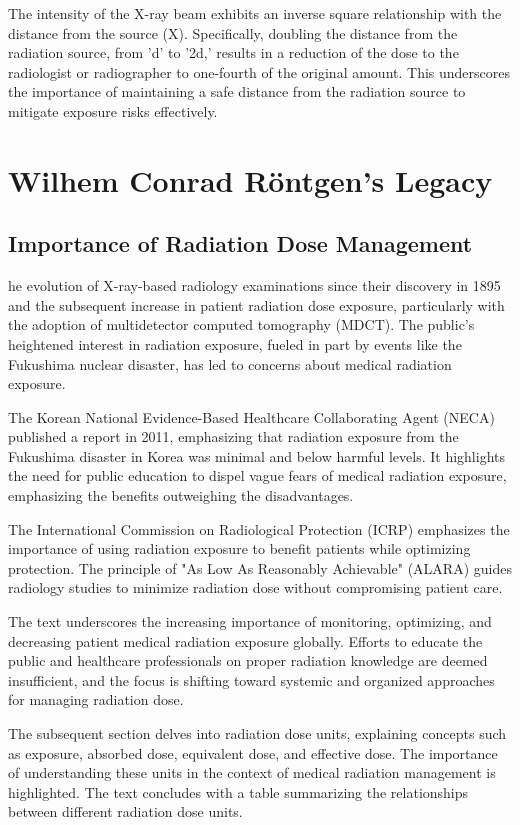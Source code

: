\documentclass[a4paper,12pt]{report}
\begin{document}
The intensity of the X-ray beam exhibits an inverse square relationship with the distance from the
source (X). Specifically, doubling the distance from the radiation source, from 'd' to '2d,' results
in a reduction of the dose to the radiologist or radiographer to one-fourth of the original amount.
This underscores the importance of maintaining a safe distance from the radiation source to
mitigate exposure risks effectively.

\chapter{Wilhem Conrad Röntgen's Legacy}
\section{Importance of Radiation Dose Management}

he evolution of X-ray-based radiology examinations since their discovery in 1895 and the
subsequent increase in patient radiation dose exposure, particularly with the adoption of
multidetector computed tomography (MDCT). The public's heightened interest in radiation
exposure, fueled in part by events like the Fukushima nuclear disaster, has led to concerns about
medical radiation exposure.

The Korean National Evidence-Based Healthcare Collaborating Agent (NECA) published a
report  in 2011, emphasizing that radiation exposure from the Fukushima disaster in Korea was
minimal and below harmful levels. It highlights the need for public education to dispel vague
fears of medical radiation exposure, emphasizing the benefits outweighing the disadvantages.

The International Commission on Radiological Protection (ICRP) emphasizes the importance of
using radiation exposure to benefit patients while optimizing protection. The principle of "As
Low As Reasonably Achievable" (ALARA) guides radiology studies to minimize radiation dose
without compromising patient care.

The text underscores the increasing importance of monitoring, optimizing, and decreasing patient
medical radiation exposure globally. Efforts to educate the public and healthcare professionals on
proper radiation knowledge are deemed insufficient, and the focus is shifting toward systemic
and organized approaches for managing radiation dose.

The subsequent section delves into radiation dose units, explaining concepts such as exposure,
absorbed dose, equivalent dose, and effective dose. The importance of understanding these units
in the context of medical radiation management is highlighted. The text concludes with a table
summarizing the relationships between different radiation dose units.
\end{document}
